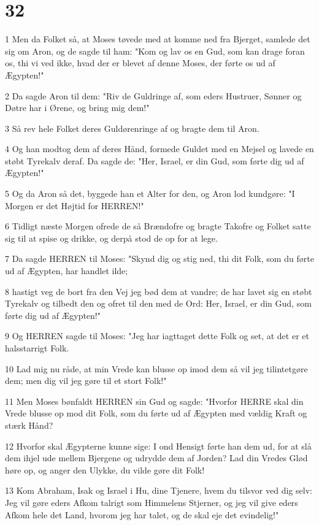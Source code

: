 \chapter{32}

\par 1 Men da Folket så, at Moses tøvede med at komme ned fra Bjerget, samlede det sig om Aron, og de sagde til ham: "Kom og lav os en Gud, som kan drage foran os, thi vi ved ikke, hvad der er blevet af denne Moses, der førte os ud af Ægypten!"
\par 2 Da sagde Aron til dem: "Riv de Guldringe af, som eders Hustruer, Sønner og Døtre har i Ørene, og bring mig dem!"
\par 3 Så rev hele Folket deres Guldørenringe af og bragte dem til Aron.
\par 4 Og han modtog dem af deres Hånd, formede Guldet med en Mejsel og lavede en støbt Tyrekalv deraf. Da sagde de: "Her, Israel, er din Gud, som førte dig ud af Ægypten!"
\par 5 Og da Aron så det, byggede han et Alter for den, og Aron lod kundgøre: "I Morgen er det Højtid for HERREN!"
\par 6 Tidligt næste Morgen ofrede de så Brændofre og bragte Takofre og Folket satte sig til at spise og drikke, og derpå stod de op for at lege.
\par 7 Da sagde HERREN til Moses: "Skynd dig og stig ned, thi dit Folk, som du førte ud af Ægypten, har handlet ilde;
\par 8 hastigt veg de bort fra den Vej jeg bød dem at vandre; de har lavet sig en støbt Tyrekalv og tilbedt den og ofret til den med de Ord: Her, Israel, er din Gud, som førte dig ud af Ægypten!"
\par 9 Og HERREN sagde til Moses: "Jeg har iagttaget dette Folk og set, at det er et halsstarrigt Folk.
\par 10 Lad mig nu råde, at min Vrede kan blusse op imod dem så vil jeg tilintetgøre dem; men dig vil jeg gøre til et stort Folk!"
\par 11 Men Moses bønfaldt HERREN sin Gud og sagde: "Hvorfor HERRE skal din Vrede blusse op mod dit Folk, som du førte ud af Ægypten med vældig Kraft og stærk Hånd?
\par 12 Hvorfor skal Ægypterne kunne sige: I ond Hensigt førte han dem ud, for at slå dem ihjel ude mellem Bjergene og udrydde dem af Jorden? Lad din Vredes Glød høre op, og anger den Ulykke, du vilde gøre dit Folk!
\par 13 Kom Abraham, Isak og Israel i Hu, dine Tjenere, hvem du tilsvor ved dig selv: Jeg vil gøre eders Afkom talrigt som Himmelens Stjerner, og jeg vil give eders Afkom hele det Land, hvorom jeg har talet, og de skal eje det evindelig!"
